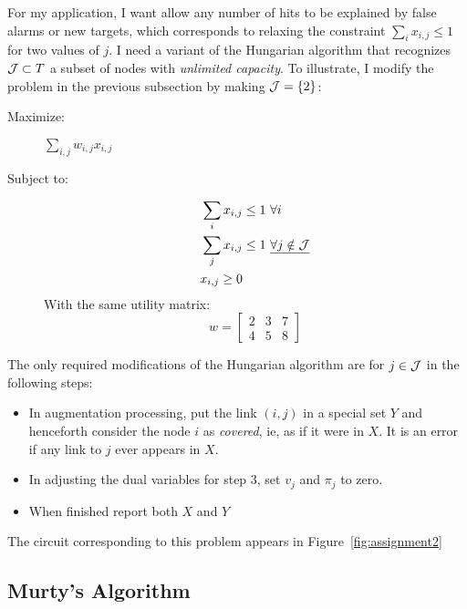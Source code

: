 \documentclass[12pt]{article}
\begin{document}
For my application, I want allow any number of hits to be explained by
false alarms or new targets, which corresponds to relaxing the
constraint $\sum_i x_{i,j} \leq 1$ for two values of $j$.  I need a
variant of the Hungarian algorithm that recognizes ${\cal J} \subset
T$ a subset of nodes with \emph{unlimited capacity}.  To illustrate, I
modify the problem in the previous subsection by making ${\cal J} =
\left\{2\right\}$:
\begin{description}
\item[Maximize:] $\sum_{i,j} w_{i,j} x_{i,j}$
\item[Subject to:]
  \begin{align*}
    \sum_i x_{i,j} &\leq 1 ~\forall i\\
    \sum_j x_{i,j} &\leq 1  ~\underline{\forall j \notin {\cal J}} \\
    x_{i,j} \geq 0
  \end{align*}
With the same utility matrix:
\begin{equation*}
  w =
  \begin{bmatrix}
    2 & 3 & 7 \\
    4 & 5 & 8
  \end{bmatrix}
\end{equation*}
\end{description}
The only required modifications of the Hungarian algorithm are for
$j\in {\cal J}$ in the following steps:
\begin{itemize}
\item In augmentation processing, put the link $(i,j)$ in a special
  set $Y$ and henceforth consider the node $i$ as \emph{covered}, ie,
  as if it were in $X$.  It is an error if any link to $j$ ever
  appears in $X$.
\item In adjusting the dual variables for step 3, set $v_j$ and
  $\pi_j$ to zero.
\item When finished report both $X$ and $Y$
\end{itemize}

The circuit corresponding to this problem appears in
Figure~\ref{fig:assignment2}
\begin{figure*}
  \centering
  \caption{Circuit equivalent of the assignment problem with no
    restriction on the number of $i$ nodes assigned to node $j=0$.}
  \label{fig:assignment2}
\end{figure*}

\subsection{Murty's Algorithm}
\label{sec:murty}
\end{document}
